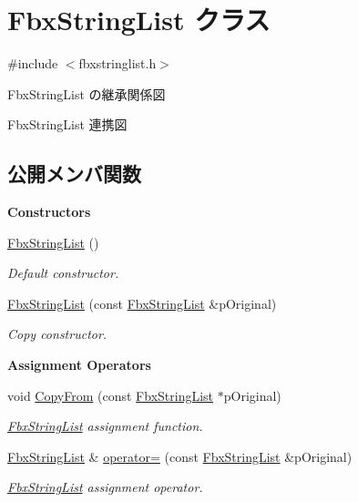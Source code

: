 \hypertarget{class_fbx_string_list}{}\section{Fbx\+String\+List クラス}
\label{class_fbx_string_list}


{\ttfamily \#include $<$fbxstringlist.\+h$>$}



Fbx\+String\+List の継承関係図


Fbx\+String\+List 連携図
\subsection*{公開メンバ関数}
\begin{Indent}\textbf{ Constructors}\par
\begin{DoxyCompactItemize}
\item 
\hyperlink{class_fbx_string_list_a412df9e48bc17c5c1fdfbea296855196}{Fbx\+String\+List} ()
\begin{DoxyCompactList}\small\item\em Default constructor. \end{DoxyCompactList}\item 
\hyperlink{class_fbx_string_list_a2bf8796a8d075564468db9aa188b4f31}{Fbx\+String\+List} (const \hyperlink{class_fbx_string_list}{Fbx\+String\+List} \&p\+Original)
\begin{DoxyCompactList}\small\item\em Copy constructor. \end{DoxyCompactList}\end{DoxyCompactItemize}
\end{Indent}
\begin{Indent}\textbf{ Assignment Operators}\par
\begin{DoxyCompactItemize}
\item 
void \hyperlink{class_fbx_string_list_a7d488c296b284ff595d9ab31b34d4702}{Copy\+From} (const \hyperlink{class_fbx_string_list}{Fbx\+String\+List} $\ast$p\+Original)
\begin{DoxyCompactList}\small\item\em \hyperlink{class_fbx_string_list}{Fbx\+String\+List} assignment function. \end{DoxyCompactList}\item 
\hyperlink{class_fbx_string_list}{Fbx\+String\+List} \& \hyperlink{class_fbx_string_list_a01f1736c5ba0e59ebfb601e620d8555f}{operator=} (const \hyperlink{class_fbx_string_list}{Fbx\+String\+List} \&p\+Original)
\begin{DoxyCompactList}\small\item\em \hyperlink{class_fbx_string_list}{Fbx\+String\+List} assignment operator. \end{DoxyCompactList}\end{DoxyCompactItemize}
\end{Indent}
